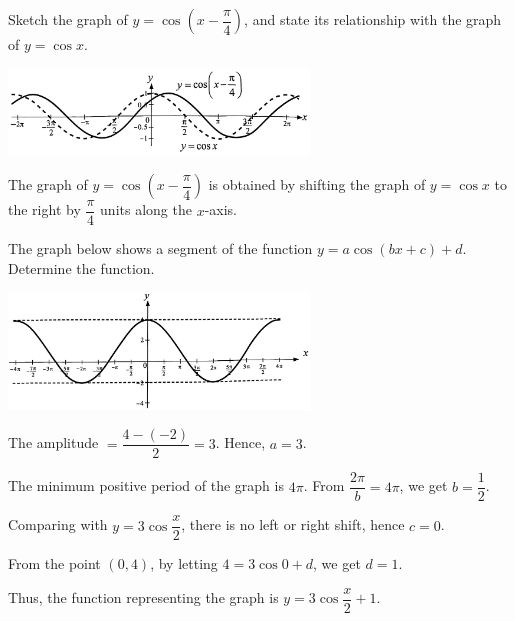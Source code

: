 \documentclass{report}
\begin{document}
        \begin{question}
            Sketch the graph of $y=\cos \left(x-\dfrac{\pi}{4}\right)$, and state its relationship with the graph of $y=\cos x$.
            
            \sol{}
            \begin{center}
                \includegraphics[width=0.6\textwidth]{assets/9-30.jpg}
            \end{center}
            \vspace{-1.5em}
            The graph of $y=\cos \left(x-\dfrac{\pi}{4}\right)$ is obtained by shifting the graph of $y=\cos x$ to the right by $\dfrac{\pi}{4}$ units along the $x$-axis.
        \end{question}
        \vspace{-1em}
        \begin{question}
            The graph below shows a segment of the function $y = a \cos(bx + c) + d$. Determine the function.
            \begin{center}
                \includegraphics[width=0.6\textwidth]{assets/9-31.jpg}
            \end{center}
            \vspace{-2em}
            \sol{}

            \noindent The amplitude $=\dfrac{4-(-2)}{2}=3$. Hence, $a=3$. 
            
            \vspace{-1em}
            \noindent The minimum positive period of the graph is $4\pi$. From $\dfrac{2\pi}{b}=4\pi$, we get $b=\dfrac{1}{2}$. 
            
            \vspace{-1em}
            \noindent Comparing with $y=3\cos\dfrac{x}{2}$, there is no left or right shift, hence $c=0$. 
            
            \vspace{-1em}
            \noindent From the point $(0,4)$, by letting $4=3\cos 0+d$, we get $d=1$. 
            
            \vspace{-1em}
            \noindent Thus, the function representing the graph is $y=3\cos\dfrac{x}{2}+1$.
            
        \end{question}
\end{document}
